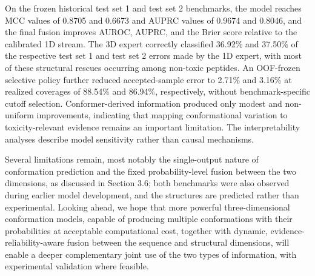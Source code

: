 \documentclass[12pt]{article}
\begin{document}
On the frozen historical test set 1 and test set 2 benchmarks, the model reaches MCC
values of 0.8705 and 0.6673 and AUPRC values of 0.9674 and 0.8046, and the
final fusion improves AUROC, AUPRC, and the Brier score relative to the
calibrated 1D stream. The 3D expert correctly classified 36.92\% and 37.50\%
of the respective test set 1 and test set 2 errors made by the 1D expert, with most of
these structural rescues occurring among non-toxic peptides. An OOF-frozen
selective policy further reduced accepted-sample error to 2.71\% and 3.16\%
at realized coverages of 88.54\% and 86.94\%, respectively, without
benchmark-specific cutoff selection. Conformer-derived information produced
only modest and non-uniform improvements, indicating that mapping
conformational variation to toxicity-relevant evidence remains an important
limitation. The interpretability analyses describe model sensitivity rather
than causal mechanisms.

Several limitations remain, most notably the single-output nature of
conformation prediction and the fixed probability-level fusion between the
two dimensions, as discussed in Section 3.6; both benchmarks were also
observed during earlier model development, and the structures are predicted
rather than experimental. Looking ahead, we hope that more powerful
three-dimensional conformation models, capable of producing multiple
conformations with their probabilities at acceptable computational cost,
together with dynamic, evidence-reliability-aware fusion between the sequence
and structural dimensions, will enable a deeper complementary joint use of
the two types of information, with experimental validation where feasible.

\end{document}
